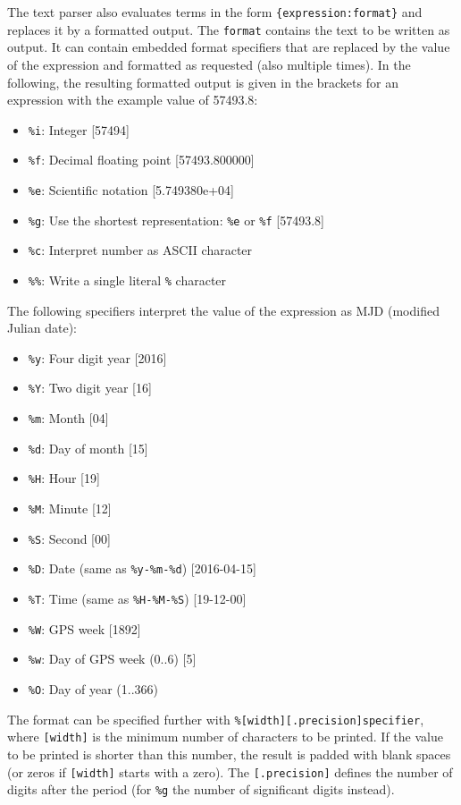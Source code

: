 The text parser also evaluates terms in the form \verb|{expression:format}| and replaces it by a formatted
output. The \verb|format| contains the text to be written as output.
It can contain embedded format specifiers that are replaced by the value of the expression
and formatted as requested (also multiple times). In the following, the resulting formatted output is given in the
brackets for an expression with the example value of 57493.8:
\begin{itemize}
\item \verb|%i|: Integer [57494]
\item \verb|%f|: Decimal floating point [57493.800000]
\item \verb|%e|: Scientific notation [5.749380e+04]
\item \verb|%g|: Use the shortest representation: \verb|%e| or \verb|%f| [57493.8]
\item \verb|%c|: Interpret number as ASCII character
\item \verb|%%|: Write a single literal \verb|%| character
\end{itemize}
The following specifiers interpret the value of the expression as MJD (modified Julian date):
\begin{itemize}
\item \verb|%y|: Four digit year [2016]
\item \verb|%Y|: Two digit year [16]
\item \verb|%m|: Month [04]
\item \verb|%d|: Day of month [15]
\item \verb|%H|: Hour [19]
\item \verb|%M|: Minute [12]
\item \verb|%S|: Second [00]
\item \verb|%D|: Date (same as \verb|%y-%m-%d|) [2016-04-15]
\item \verb|%T|: Time (same as \verb|%H-%M-%S|) [19-12-00]
\item \verb|%W|: GPS week [1892]
\item \verb|%w|: Day of GPS week (0..6) [5]
\item \verb|%O|: Day of year (1..366)
\end{itemize}
The format can be specified further with \verb|%[width][.precision]specifier|,
where \verb|[width]| is the minimum number of characters to be printed.
If the value to be printed is shorter than this number, the result is padded with blank spaces
(or zeros if \verb|[width]| starts with a zero).
The \verb|[.precision]| defines the number of digits after the period (for \verb|%g| the number of
significant digits instead).

